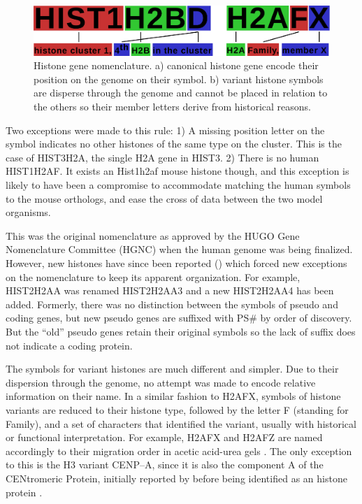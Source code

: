 \documentclass[10pt,a4paper,twocolumn,article]{memoir}
\begin{document}
      \begin{figure}
        \centering
        \includegraphics[width=\textwidth]{nomenclature-schematic.pdf}
        \caption{Histone gene nomenclature. a) canonical histone gene encode their position
                 on the genome on their symbol. b) variant histone symbols are disperse through
                 the genome and cannot be placed in relation to the others so their member
                 letters derive from historical reasons.}
        \label{fig:nomenclature}
      \end{figure}

      Two exceptions were made to this rule: 1) A missing position letter on the symbol indicates
      no other histones of the same type on the cluster. This is the case of HIST3H2A, the
      single H2A gene in HIST3. 2) There is no human HIST1H2AF. It exists an Hist1h2af mouse
      histone though, and this exception is likely to have been a compromise to accommodate
      matching the human symbols to the mouse orthologs, and ease the cross of data between the
      two model organisms.

      This was the original nomenclature as approved by the HUGO Gene Nomenclature Committee (HGNC)
      when the human genome was being finalized. However, new histones have since been
      reported () which forced new exceptions on the
      nomenclature to keep its apparent organization. For example, HIST2H2AA was renamed
      HIST2H2AA3 and a new HIST2H2AA4 has been added. Formerly, there was no distinction
      between the symbols of pseudo and coding genes, but new pseudo genes are suffixed with
      PS\# by order of discovery. But the ``old'' pseudo genes retain their original symbols
      so the lack of suffix does not indicate a coding protein.

      The symbols for variant histones are much different and simpler. Due to their dispersion
      through the genome, no attempt was made to encode relative information on their name. In
      a similar fashion to H2AFX, symbols of histone variants are reduced to their histone type,
      followed by the letter F (standing for Family), and a set of characters that identified
      the variant, usually with historical or functional interpretation. For example, H2AFX and
      H2AFZ are named accordingly to their migration order in acetic acid-urea gels
      \citep{HTwoA-first-variants}.
      The only exception to this is the H3 variant CENP--A, since it is also the component A
      of the CENtromeric Protein, initially reported by \cite{CENPA-first-report} before being
      identified as an histone protein \citep{CENPA-copurifies-histones, CENPA-sequence-analysis}.
\end{document}
